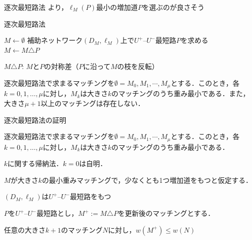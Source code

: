 \documentclass[14pt,aspectratio=169,xcolor=dvipsnames,table,onlytextwidth,dvipdfmx]{beamer}
\begin{document}
\begin{frame}{逐次最短路法}
    \small
    より，$\ell_M(P)$最小の増加道$P$を選ぶのが良さそう

    \begin{block}{逐次最短路法}
        \begin{algorithmic}[1]
            \STATE $M \gets \emptyset$ 
                \STATE 補助ネットワーク$(D_M, \ell_M)$上で$U^+$--$U^-$最短路$P$を求める \\ 
                \STATE $M \gets M \triangle P$ 
            \ENDWHILE
        \end{algorithmic}
    \end{block}
        {\footnotesize $M \triangle P$: $M$と$P$の対称差（$P$に沿って$M$の枝を反転）}

        \pause
        \bigskip
        \begin{theorem}
            逐次最短路法で求まるマッチングを$\emptyset = M_0, M_1, \cdots,M_{\mu}$とする．このとき，各$k=0, 1, \dots, \mu$に対し，$M_k$は大きさ$k$のマッチングのうち重み最小である．また，大きさ$\mu+1$以上のマッチングは存在しない．
        \end{theorem}
\end{frame}

\begin{frame}[t]{逐次最短路法の証明}
    \small
    \begin{theorem}
        逐次最短路法で求まるマッチングを$\emptyset = M_0, M_1, \cdots,M_{\mu}$とする．このとき，各$k=0, 1, \dots, \mu$に対し，$M_k$は大きさ$k$のマッチングのうち重み最小である．
    \end{theorem}

 $k$に関する帰納法．$k=0$は自明． 

$M$が大きさ$k$の最小重みマッチングで，少なくとも1つ増加道をもつと仮定する．

\bigskip
\onslide<+->
 $(D_M, \ell_M)$は$U^+$--$U^-$最短路をもつ \\

\bigskip
\onslide<+->
$P$を$U^+$--$U^-$最短路とし，$M^+ := M \triangle P$を更新後のマッチングとする．

\bigskip
{} 任意の大きさ$k+1$のマッチング$N$に対し，$w(M^+) \leq w(N)$
\end{frame}
\end{document}
